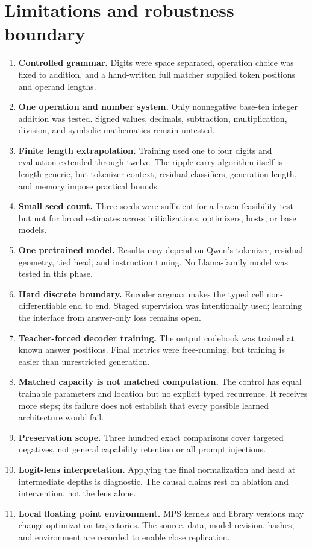 \documentclass[11pt]{article}
\begin{document}
\section{Limitations and robustness boundary}

\begin{enumerate}
  \item \textbf{Controlled grammar.} Digits were space separated, operation
  choice was fixed to addition, and a hand-written full matcher supplied token
  positions and operand lengths.
  \item \textbf{One operation and number system.} Only nonnegative base-ten
  integer addition was tested. Signed values, decimals, subtraction,
  multiplication, division, and symbolic mathematics remain untested.
  \item \textbf{Finite length extrapolation.} Training used one to four digits
  and evaluation extended through twelve. The ripple-carry algorithm itself
  is length-generic, but tokenizer context, residual classifiers, generation
  length, and memory impose practical bounds.
  \item \textbf{Small seed count.} Three seeds were sufficient for a frozen
  feasibility test but not for broad estimates across initializations,
  optimizers, hosts, or base models.
  \item \textbf{One pretrained model.} Results may depend on Qwen's tokenizer,
  residual geometry, tied head, and instruction tuning. No Llama-family model
  was tested in this phase.
  \item \textbf{Hard discrete boundary.} Encoder argmax makes the typed cell
  non-differentiable end to end. Staged supervision was intentionally used;
  learning the interface from answer-only loss remains open.
  \item \textbf{Teacher-forced decoder training.} The output codebook was
  trained at known answer positions. Final metrics were free-running, but
  training is easier than unrestricted generation.
  \item \textbf{Matched capacity is not matched computation.} The control has
  equal trainable parameters and location but no explicit typed recurrence.
  It receives more steps; its failure does not establish that every possible
  learned architecture would fail.
  \item \textbf{Preservation scope.} Three hundred exact comparisons cover
  targeted negatives, not general capability retention or all prompt
  injections.
  \item \textbf{Logit-lens interpretation.} Applying the final normalization
  and head at intermediate depths is diagnostic. The causal claims rest on
  ablation and intervention, not the lens alone.
  \item \textbf{Local floating point environment.} MPS kernels and library
  versions may change optimization trajectories. The source, data, model
  revision, hashes, and environment are recorded to enable close replication.
\end{enumerate}
\end{document}
